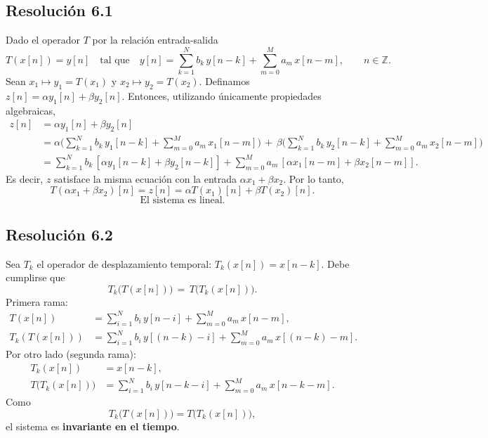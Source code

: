 \documentclass[
  11pt,
  letterpaper,
   addpoints,
   answers
  ]{exam}
\begin{document}
\begin{questions}
\begin{solution}
\subsection*{Resolución 6.1}
Dado el operador $T$ por la relación entrada-salida
\[
  T(x[n]) = y[n] \quad \text{tal que} \quad
  y[n]=\sum_{k=1}^{N} b_k\,y[n-k]+\sum_{m=0}^{M} a_m\,x[n-m],\qquad n\in\mathbb Z.
\]
 Sean $x_1\mapsto y_1=T(x_1)$ y $x_2\mapsto y_2=T(x_2)$. Definamos
\( z[n] = \alpha y_1[n] + \beta y_2[n] \). Entonces, utilizando únicamente propiedades algebraicas,
\begin{align}
  z[n]
   &= \alpha y_1[n] + \beta y_2[n] \\
   &= \alpha\Big(\sum_{k=1}^{N} b_k\,y_1[n-k] + \sum_{m=0}^{M} a_m\,x_1[n-m]\Big)
    \, +\, \beta\Big(\sum_{k=1}^{N} b_k\,y_2[n-k] + \sum_{m=0}^{M} a_m\,x_2[n-m]\Big) \\
   &= \sum_{k=1}^{N} b_k\,[\alpha y_1[n-k]+\beta y_2[n-k]]
      + \sum_{m=0}^{M} a_m\,[\alpha x_1[n-m]+\beta x_2[n-m]].
\end{align}
Es decir, $z$ satisface la misma ecuación con la entrada $\alpha x_1+\beta x_2$. Por lo tanto,
\[
  T(\alpha x_1+\beta x_2)[n] = z[n] = \alpha T(x_1)[n] + \beta T(x_2)[n].
\]
\[\boxed{\text{El sistema es lineal.}}\]

\subsection*{Resolución 6.2}
Sea $T_k$ el operador de desplazamiento temporal: $T_k(x[n])=x[n-k]$. Debe cumplirse que
\begin{equation}
  T_k\big(T(x[n])\big) \,=\, T\big(T_k(x[n])\big).
\end{equation}
\noindent
Primera rama:
\begin{align}
  T(x[n]) &= \sum_{i=1}^{N} b_i\,y[n-i] + \sum_{m=0}^{M} a_m\,x[n-m], \\
  T_k\!\left(T(x[n])\right) &= \sum_{i=1}^{N} b_i\,y[(n-k)-i] + \sum_{m=0}^{M} a_m\,x[(n-k)-m].
\end{align}
Por otro lado (segunda rama):
\begin{align}
  T_k(x[n]) &= x[n-k], \\
  T\big(T_k(x[n])\big) &= \sum_{i=1}^{N} b_i\,y[n-k-i] + \sum_{m=0}^{M} a_m\,x[n-k-m].
\end{align}
Como
\[
  T_k\big(T(x[n])\big) = T\big(T_k(x[n])\big),
\]
el sistema es \textbf{invariante en el tiempo}.


\end{solution}
\end{questions}
\end{document}
